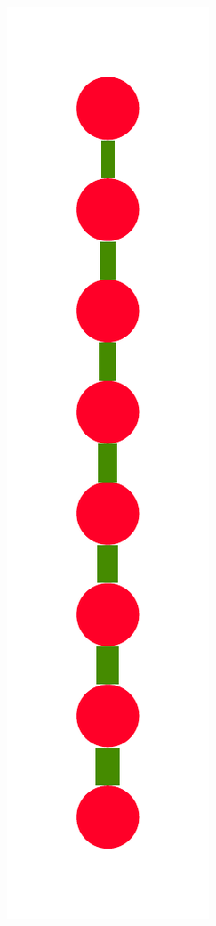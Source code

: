 \documentclass[a4paper,10pt]{article}
\begin{document}
\begin{figure}
{    \includegraphics[scale=.14]{../figures/vector/6-3-recursion-data-8.pdf}
    \label{fig:exp-simple-recursion-data}
    }
    \qquad
\end{figure}
\end{document}
